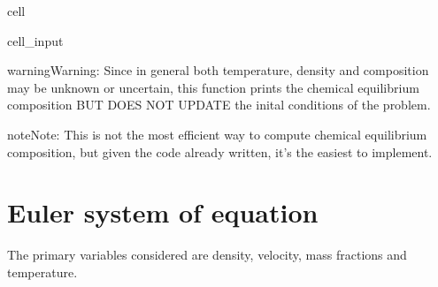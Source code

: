 \documentclass[letterpaper,10pt,english]{jupyterBook}
\begin{document}
\begin{sphinxuseclass}{cell}
\begin{sphinxVerbatimInput}
\begin{sphinxuseclass}{cell_input}
\begin{sphinxVerbatim}[commandchars=\\\{\}]
              
            
           
            
     

  
\end{sphinxVerbatim}

\end{sphinxuseclass}\end{sphinxVerbatimInput}

\end{sphinxuseclass}
\begin{sphinxadmonition}{warning}{Warning:}
\sphinxAtStartPar
Since in general both temperature, density and composition may be unknown or uncertain, this function prints the chemical equilibrium composition BUT DOES NOT UPDATE the inital conditions of the problem.
\end{sphinxadmonition}

\begin{sphinxadmonition}{note}{Note:}
\sphinxAtStartPar
This is not the most efficient way to compute chemical equilibrium composition, but given the code already written, it’s the easiest to implement.
\end{sphinxadmonition}


\section{Euler system of equation}
\label{\detokenize{1_Temperature/Problem_class_definition:euler-system-of-equation}}
\sphinxAtStartPar
The primary variables considered are density, velocity, mass fractions and temperature. 
\end{document}
